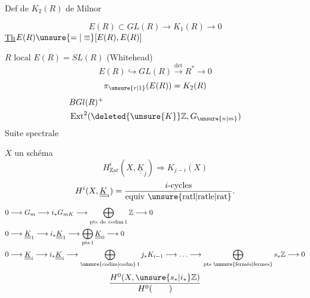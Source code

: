 Def de $K_2(R)$ de Milnor

\[
E(R)\subset GL(R)\longrightarrow K_1(R)\longrightarrow0
\]
\uline{Th}\quad $E(R)\unsure{=|\equiv}[E(R),E(R)]$

$R$ local \quad $E(R)=SL(R)$ \quad (Whitehead)
\[
E(R)\hookrightarrow GL(R)\xrightarrow{\det}R^{*}\longrightarrow0
\]
\[
\pi_{\unsure{r|1}}(E(R))=K_2(R)
\]
\[
\begin{aligned}
&BGl(R)^{+}\\
&\operatorname{Ext}^{2}(\deleted{\unsure{K}}\mathbb Z,G_{\unsure{n|m}})
\end{aligned}
\]
Suite spectrale

$X$ un schéma
\[
H_{\underline{\underline{\mathrm{Zar}}}}^{i}(X,\underline{\underline K}_j)\Longrightarrow K_{j-i}(X)
\]
\[
H^{i}(X,\underline{\underline K}_i)=\frac{i\text{-cycles}}{\text{equiv \unsure{ratl|ratle|rat}}}.
\]
{\small
\[
\begin{aligned}
0&\longrightarrow G_m\longrightarrow i_*G_{mK}\longrightarrow
\bigoplus_{\mathrm{pts\ de\ codim}\,1}\mathbb Z\longrightarrow0\\
0&\longrightarrow\underline{\underline K}_1\longrightarrow i_*\underline{\underline K}_1
\longrightarrow\bigoplus_{\mathrm{pts}\,1}\underline{\underline K}_0\longrightarrow0\\
0&\longrightarrow\underline{\underline K}_i\longrightarrow i_*\underline{\underline K}_i
\longrightarrow\bigoplus_{\text{\unsure{codim|codm}}\,1}j_*K_{i-1}\longrightarrow\ldots
\longrightarrow\bigoplus_{\text{pts \unsure{fermés|fermes}}}s_*\mathbb Z\longrightarrow0
\end{aligned}
\]
}
\[
\frac{H^0(X,\unsure{s_*|i_*}\mathbb Z)}{H^0(\qquad)}
\]
